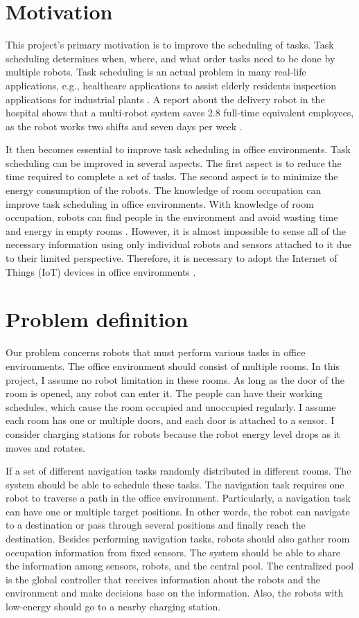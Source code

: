 \section{Motivation}
This project's primary motivation is to improve the scheduling of tasks. 
Task scheduling determines when, where, and what order tasks need to be done by multiple robots. Task scheduling is an actual problem in many real-life applications, e.g., healthcare applications to assist elderly residents \cite{retire2017} inspection applications for industrial plants \cite{Chun12}. A report about the delivery robot in the hospital shows that a multi-robot system saves 2.8 full-time equivalent employees, as the robot works two shifts and seven days per week \cite{Jeon17}.
 
It then becomes essential to improve task scheduling in office environments. Task scheduling can be improved in several aspects. The first aspect is to reduce the time required to complete a set of tasks. The second aspect is to minimize the energy consumption of the robots. The knowledge of room occupation can improve task scheduling in office environments. With knowledge of room occupation, robots can find people in the environment and avoid wasting time and energy in empty rooms \cite{retire2017}. However, it is almost impossible to sense all of the necessary information using only individual robots and sensors attached to it due to their limited perspective. Therefore, it is necessary to adopt the Internet of Things (IoT) devices in office environments \cite{PYO2015148}. 




\section{Problem definition}

Our problem concerns robots that must perform various tasks in office environments. The office environment should consist of multiple rooms. In this project, I assume no robot limitation in these rooms. As long as the door of the room is opened, any robot can enter it.  The people can have their working schedules, which cause the room occupied and unoccupied regularly. I assume each room has one or multiple doors, and each door is attached to a sensor.  I consider charging stations for robots because the robot energy level drops as it moves and rotates.  

If a set of different navigation tasks randomly distributed in different rooms. The system should be able to schedule these tasks. The navigation task requires one robot to traverse a path in the office environment. Particularly, a navigation task can have one or multiple target positions. In other words, the robot can navigate to a destination or pass through several positions and finally reach the destination. Besides performing navigation tasks, robots should also gather room occupation information from fixed sensors. The system should be able to share the information among sensors, robots, and the central pool. The centralized pool is the global controller that receives information about the robots and the environment and make decisions base on the information.  Also, the robots with low-energy should go to a nearby charging station.

